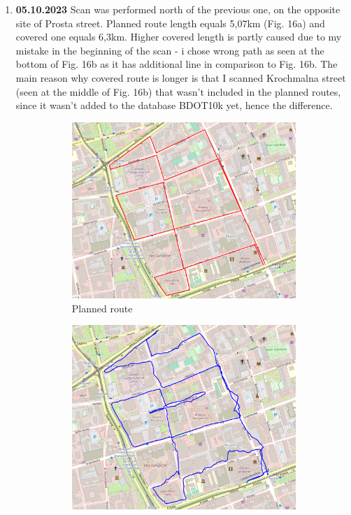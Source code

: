 \documentclass[a4paper,12pt]{article}
\begin{document}
\begin{enumerate}
	\item \textbf{05.10.2023} Scan was performed north of the previous one, on the opposite site of Prosta street. Planned route length equals 5,07km (Fig. 16a) and covered one equals 6,3km. Higher covered length is partly caused due to my mistake in the beginning of the scan - i chose wrong path as seen at the bottom of Fig. 16b as it has additional line in comparison to Fig. 16b. The main reason why covered route is longer is that I scanned Krochmalna street (seen at the middle of Fig. 16b) that wasn't included in the planned routes, since it wasn't added to the database BDOT10k yet, hence the difference. 
	\begin{figure}[H]
		\centering
		\begin{subfigure}{.85\textwidth}
			\centering
			\includegraphics[width=1\linewidth]{route_p15}
			\caption{Planned route}
			\label{fig:a15}
		\end{subfigure}%
		\linebreak
		\begin{subfigure}{.85\textwidth}
			\centering
			\includegraphics[width=1\linewidth]{route_c15}

\end{subfigure}
\end{figure}
\end{enumerate}
\end{document}
